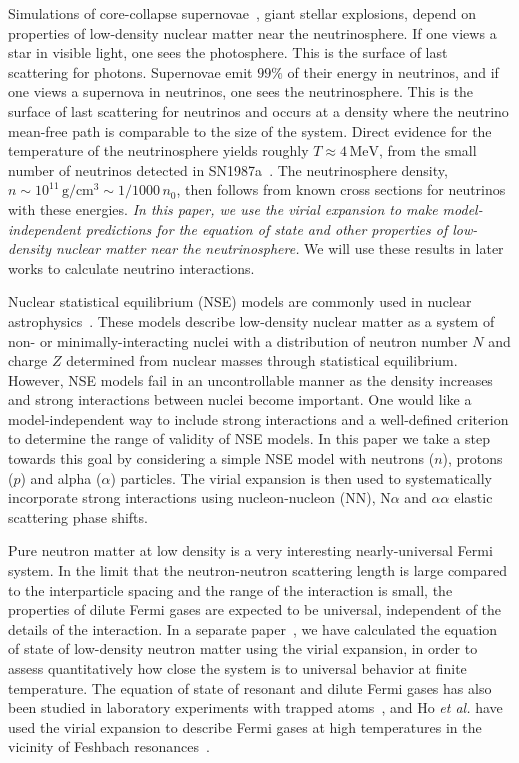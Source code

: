 \documentclass[aps,prc,twocolumn,showpacs,showkeys,amsmath,amssymb]{revtex4}
\newcommand{\mev}{\, \text{MeV}}
\newcommand{\gcq}{\, \text{g}/\text{cm}^{3}}
\begin{document}
Simulations of core-collapse supernovae~\cite{snsim1,snsim2}, giant stellar 
explosions, depend on properties of low-density nuclear matter near 
the neutrinosphere.  If one views a star in visible light, one sees 
the photosphere.  This is the surface of last scattering for photons. 
Supernovae emit $99\%$ of their energy in neutrinos, and if one views 
a supernova in neutrinos, one sees the neutrinosphere.  This is the 
surface of last scattering for neutrinos and occurs at a density 
where the neutrino mean-free path is comparable to the size of the system. 
Direct evidence for the temperature of the neutrinosphere yields 
roughly $T \approx 4 \mev$, from the small number of neutrinos 
detected in SN1987a~\cite{sn1987a1,sn1987a2}. The neutrinosphere density, 
$n \sim 10^{11} \gcq \sim 1/1000 \, n_0$, then follows from known 
cross sections for neutrinos with these energies.  
{\it In this paper, we use the virial expansion to make 
model-independent predictions for the equation of state and other 
properties of low-density nuclear matter near the neutrinosphere.}  
We will use these results in later works to calculate neutrino interactions.

Nuclear statistical equilibrium (NSE) models are commonly used in 
nuclear astrophysics~\cite{nse}.  These models describe low-density
nuclear matter as a system of non- or minimally-interacting nuclei with 
a distribution of neutron number $N$ and charge $Z$ determined 
from nuclear masses through statistical equilibrium.  
However, NSE models fail in an uncontrollable manner as the density 
increases and strong interactions between nuclei become important.  
One would like a model-independent way to include strong interactions 
and a well-defined criterion to determine the range of validity of 
NSE models.  In this paper we take a step towards this goal by 
considering a simple NSE model with neutrons ($n$), protons ($p$) 
and alpha ($\alpha$) particles.  The virial expansion is then used to 
systematically incorporate strong interactions using nucleon-nucleon
(NN), N$\alpha$ and $\alpha\alpha$ elastic scattering phase shifts.

Pure neutron matter at low density is a very interesting 
nearly-universal Fermi system. In the limit that the neutron-neutron
scattering length is large compared to the interparticle 
spacing and the range of the interaction is small, 
the properties of dilute Fermi gases are 
expected to be universal, independent of the details of the 
interaction.  In a separate paper~\cite{vEOSneut},
we have calculated the equation of state of low-density neutron
matter using the virial expansion, in order to assess quantitatively 
how close the system is to universal behavior at finite temperature.  
The equation of state of resonant and dilute Fermi gases has also been 
studied in laboratory experiments with trapped 
atoms~\cite{Thomas1,Thomas2,Salomon,Grimm}, and Ho 
{\it et al.} have used the virial expansion to describe Fermi
gases at high temperatures in the vicinity of Feshbach 
resonances~\cite{Ho1,Ho2}.
\end{document}
